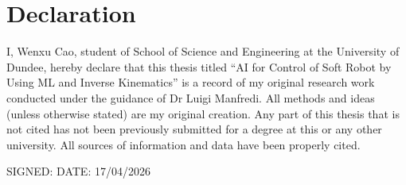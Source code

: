 \chapter{Declaration}
\thispagestyle{plain}

I, Wenxu Cao, student of School of Science and Engineering at the University of Dundee, hereby declare that this thesis titled ``AI for Control of Soft Robot by Using ML and Inverse Kinematics'' is a record of my original research work conducted under the guidance of Dr Luigi Manfredi. All methods and ideas (unless otherwise stated) are my original creation. Any part of this thesis that is not cited has not been previously submitted for a degree at this or any other university. All sources of information and data have been properly cited.

\vspace{2cm}
\begin{flushright}
SIGNED:   \hspace{4cm} DATE: 17/04/2026
\end{flushright}
